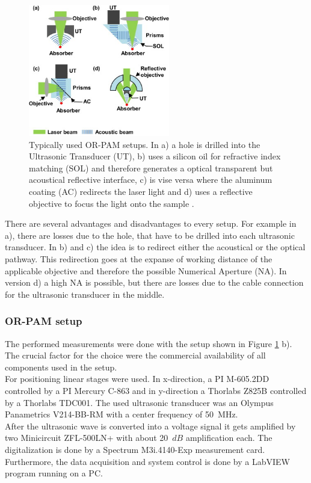 \begin{figure}[H]
	\centering
	\includegraphics[width = 0.55\textwidth, height=0.3\textheight]{02_principles_of_photoacoustics/images/pamSetups.jpg}
	\caption{Typically used OR-PAM setups. In a) a hole is drilled into the Ultrasonic Transducer (UT), b) uses a silicon oil for refractive index matching (SOL) and therefore generates a optical transparent but acoustical reflective interface, c) is vise versa where the aluminum coating (AC) redirects the laser light and d) uses a reflective objective to focus the light onto the sample \cite{YAO201487}.}
	\label{fig:PAMsetup}
\end{figure}

There are several advantages and disadvantages to every setup.  For example in a), there are losses due to the hole, that have to be drilled into each ultrasonic transducer. In b) and c) the idea is to redirect either the acoustical or the optical pathway. This redirection goes at the expanse of working distance of the applicable objective and therefore the possible Numerical Aperture (NA). In version d) a high NA is possible, but there are losses due to the cable connection for the ultrasonic transducer in the middle. 

\subsubsection{OR-PAM setup}
\label{sec:ORPAMsetup}

The performed measurements were done with the setup shown in Figure \ref{fig:PAMsetup} b). The crucial factor for the choice were the commercial availability of all components used in the setup.\\
For positioning linear stages were used. In x-direction, a PI M-605.2DD controlled by a PI Mercury C-863  and in y-direction a Thorlabs Z825B controlled by a Thorlabs TDC001. The used ultrasonic transducer was an Olympus Panametrics V214-BB-RM with a center frequency of 50~MHz.\\
After the ultrasonic wave is converted into a voltage signal it gets amplified by two Minicircuit ZFL-500LN+ with about 20~$dB$ amplification each. The digitalization is done by a Spectrum M3i.4140-Exp measurement card. Furthermore, the data acquisition and system control is done by a LabVIEW program running on a PC. 

